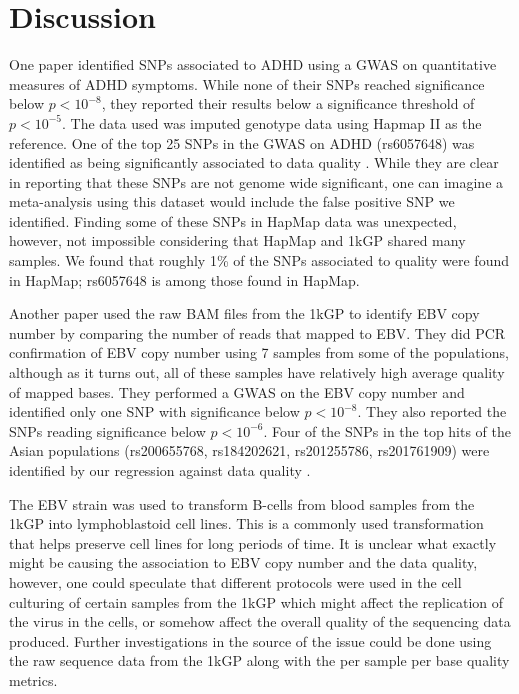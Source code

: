 \documentclass[9pt,lineno]{elife}
\begin{document}
\section{Discussion}
One paper identified SNPs associated to ADHD using a GWAS on quantitative measures of ADHD symptoms.
While none of their SNPs reached significance below $ p < 10^{-8}$, they reported their results below a significance threshold of $ p < 10^{-5}$.
The data used was imputed genotype data using Hapmap II as the reference.
One of the top 25 SNPs in the GWAS on ADHD (rs6057648) was identified as being significantly associated to data quality \citep{Ebejer2013}.
While they are clear in reporting that these SNPs are not genome wide significant, one can imagine a meta-analysis using this dataset would include the false positive SNP we identified.
Finding some of these SNPs in HapMap data was unexpected, however, not impossible considering that HapMap and 1kGP shared many samples.
We found that roughly 1\% of the SNPs associated to quality were found in HapMap; rs6057648 is among those found in HapMap.

Another paper used the raw BAM files from the 1kGP to identify EBV copy number by comparing the number of reads that mapped to EBV.
They did PCR confirmation of EBV copy number using 7 samples from some of the populations, although as it turns out, all of these samples have relatively high average quality of mapped bases.
They performed a GWAS on the EBV copy number and identified only one SNP with significance below $ p < 10^{-8}$. 
They also reported the SNPs reading significance below $ p < 10^{-6}$. 
Four of the SNPs in the top hits of the Asian populations (rs200655768, rs184202621, rs201255786, rs201761909) were identified by our regression against data quality \citep{Mandage2017}.

The EBV strain was used to transform B-cells from blood samples from the 1kGP into lymphoblastoid cell lines.
This is a commonly used transformation that helps preserve cell lines for long periods of time.
It is unclear what exactly might be causing the association to EBV copy number and the data quality, however, one could speculate that different protocols were used in the cell culturing of certain samples from the 1kGP which might affect the replication of the virus in the cells, or somehow affect the overall quality of the sequencing data produced.
Further investigations in the source of the issue could be done using the raw sequence data from the 1kGP along with the per sample per base quality metrics. 			
\end{document}
